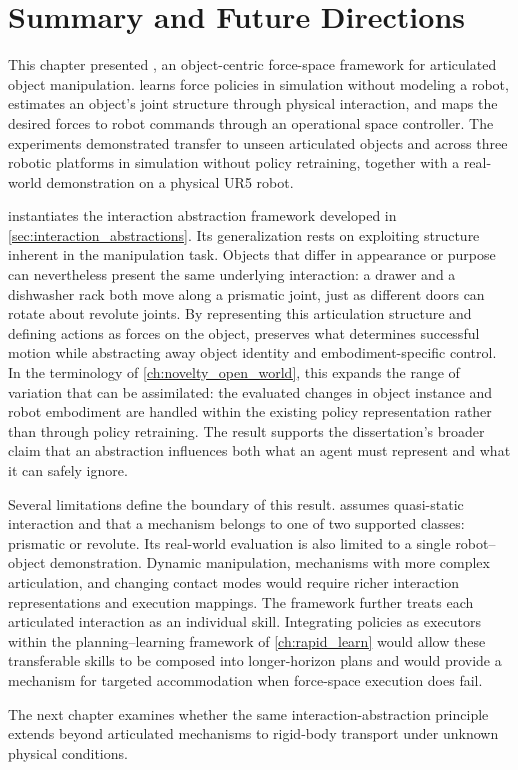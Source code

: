 \section{Summary and Future Directions}
\label{sec:flex_summary}

This chapter presented \FLEX{}, an object-centric force-space framework for articulated object manipulation. \FLEX{} learns force policies in simulation without modeling a robot, estimates an object's joint structure through physical interaction, and maps the desired forces to robot commands through an operational space controller. The experiments demonstrated transfer to unseen articulated objects and across three robotic platforms in simulation without policy retraining, together with a real-world demonstration on a physical UR5 robot.

\FLEX{} instantiates the interaction abstraction framework developed in \cref{sec:interaction_abstractions}. Its generalization rests on exploiting structure inherent in the manipulation task. Objects that differ in appearance or purpose can nevertheless present the same underlying interaction: a drawer and a dishwasher rack both move along a prismatic joint, just as different doors can rotate about revolute joints. By representing this articulation structure and defining actions as forces on the object, \FLEX{} preserves what determines successful motion while abstracting away object identity and embodiment-specific control. In the terminology of \cref{ch:novelty_open_world}, this expands the range of variation that can be assimilated: the evaluated changes in object instance and robot embodiment are handled within the existing policy representation rather than through policy retraining. The result supports the dissertation's broader claim that an abstraction influences both what an agent must represent and what it can safely ignore.

Several limitations define the boundary of this result. \FLEX{} assumes quasi-static interaction and that a mechanism belongs to one of two supported classes: prismatic or revolute. Its real-world evaluation is also limited to a single robot--object demonstration. Dynamic manipulation, mechanisms with more complex articulation, and changing contact modes would require richer interaction representations and execution mappings. The framework further treats each articulated interaction as an individual skill. Integrating \FLEX{} policies as executors within the planning--learning framework of \cref{ch:rapid_learn} would allow these transferable skills to be composed into longer-horizon plans and would provide a mechanism for targeted accommodation when force-space execution does fail.

The next chapter examines whether the same interaction-abstraction principle extends beyond articulated mechanisms to rigid-body transport under unknown physical conditions.
